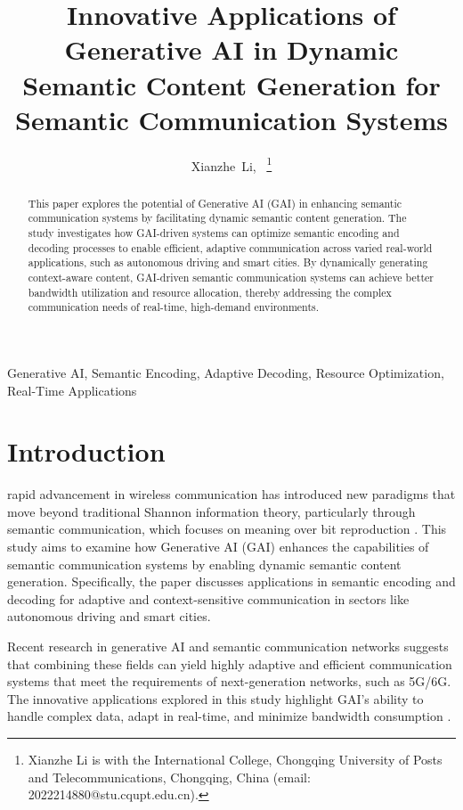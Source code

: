 \documentclass[journal]{IEEEtran}
\title{Innovative Applications of Generative AI in Dynamic Semantic Content Generation for Semantic Communication Systems}
\author{Xianzhe~Li,~\IEEEmembership{Student ID:~2022214880} 
\thanks{Xianzhe Li is with the International College, Chongqing University of Posts and Telecommunications, Chongqing, China (email: 2022214880@stu.cqupt.edu.cn).}
}
\begin{document}
\maketitle

\begin{abstract}
This paper explores the potential of Generative AI (GAI) in enhancing semantic communication systems by facilitating dynamic semantic content generation. The study investigates how GAI-driven systems can optimize semantic encoding and decoding processes to enable efficient, adaptive communication across varied real-world applications, such as autonomous driving and smart cities. By dynamically generating context-aware content, GAI-driven semantic communication systems can achieve better bandwidth utilization and resource allocation, thereby addressing the complex communication needs of real-time, high-demand environments.
\end{abstract}

\begin{IEEEkeywords}
Generative AI, Semantic Encoding, Adaptive Decoding, Resource Optimization, Real-Time Applications
\end{IEEEkeywords}



\IEEEpeerreviewmaketitle

\section{Introduction}
 rapid advancement in wireless communication has introduced new paradigms that move beyond traditional Shannon information theory, particularly through semantic communication, which focuses on meaning over bit reproduction \cite{9530497}. This study aims to examine how Generative AI (GAI) enhances the capabilities of semantic communication systems by enabling dynamic semantic content generation. Specifically, the paper discusses applications in semantic encoding and decoding for adaptive and context-sensitive communication in sectors like autonomous driving and smart cities.

Recent research in generative AI \cite{Radford2018ImprovingLU} and semantic communication networks \cite{10614204,10447237} suggests that combining these fields can yield highly adaptive and efficient communication systems that meet the requirements of next-generation networks, such as 5G/6G. The innovative applications explored in this study highlight GAI’s ability to handle complex data, adapt in real-time, and minimize bandwidth consumption \cite{liu2024semanticcommunicationsartificialintelligence}.
\end{document}
